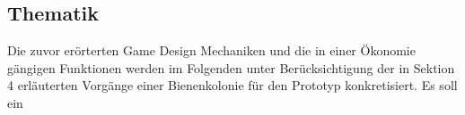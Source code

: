 \subsection{Thematik}
Die zuvor erörterten Game Design Mechaniken und die in einer Ökonomie gängigen Funktionen werden im Folgenden unter Berücksichtigung der in Sektion 4 erläuterten Vorgänge einer Bienenkolonie für den Prototyp konkretisiert. Es soll ein